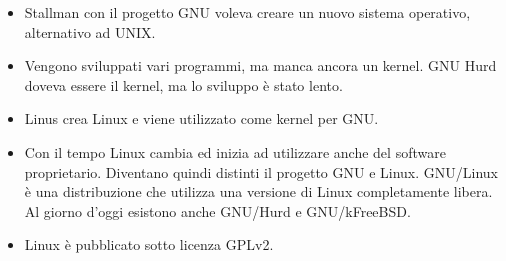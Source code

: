 \begin{itemize}
	\item Stallman con il progetto GNU voleva creare un nuovo sistema operativo, alternativo ad UNIX.
	\item Vengono sviluppati vari programmi, ma manca ancora un kernel. GNU Hurd doveva essere il kernel, ma lo sviluppo è stato lento.
	\item Linus crea Linux e viene utilizzato come kernel per GNU.
	\item Con il tempo Linux cambia ed inizia ad utilizzare anche del software proprietario. Diventano quindi distinti il progetto GNU e Linux. GNU/Linux è una distribuzione che utilizza una versione di Linux completamente libera. Al giorno d'oggi esistono anche GNU/Hurd e GNU/kFreeBSD.
	\item Linux è pubblicato sotto licenza GPLv2.
\end{itemize}
